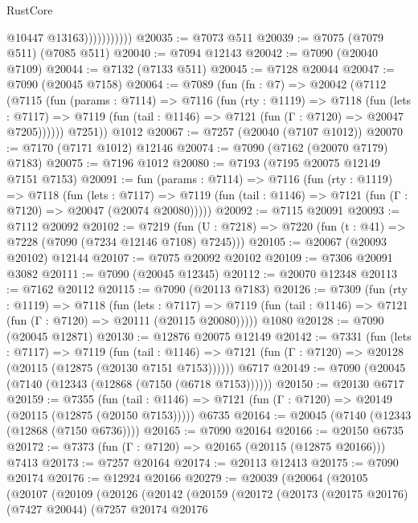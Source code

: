 \begin{lexlean}{RustCore}
\begin{coremodule}
                          @10447
                          @13163)))))))))))
@20035 := @7073 @511
@20039 := @7075 (@7079 @511) (@7085 @511)
@20040 := @7094 @12143
@20042 := @7090 (@20040 @7109)
@20044 := @7132 (@7133 @511)
@20045 := @7128 @20044
@20047 := @7090 (@20045 @7158)
@20064 := @7089
    (fun (fn : @7) =>
    @20042
      (@7112
        (@7115
          (fun (params : @7114) =>
          @7116
            (fun (rty : @1119) =>
            @7118
              (fun (lets : @7117) =>
              @7119 (fun (tail : @1146) => @7121 (fun (Γ : @7120) => @20047 @7205))))))
        @7251))
    @1012
@20067 := @7257 (@20040 (@7107 @1012))
@20070 := @7170 (@7171 @1012) @12146
@20074 := @7090 (@7162 (@20070 @7179) @7183)
@20075 := @7196 @1012
@20080 := @7193 (@7195 @20075 @12149 @7151 @7153)
@20091 := fun (params : @7114) =>
  @7116
    (fun (rty : @1119) =>
    @7118
      (fun (lets : @7117) =>
      @7119 (fun (tail : @1146) => @7121 (fun (Γ : @7120) => @20047 (@20074 @20080)))))
@20092 := @7115 @20091
@20093 := @7112 @20092
@20102 := @7219
    (fun (U : @7218) => @7220 (fun (t : @41) => @7228 (@7090 (@7234 @12146 @7108) @7245)))
@20105 := @20067 (@20093 @20102) @12144
@20107 := @7075 @20092 @20102
@20109 := @7306 @20091 @3082
@20111 := @7090 (@20045 @12345)
@20112 := @20070 @12348
@20113 := @7162 @20112
@20115 := @7090 (@20113 @7183)
@20126 := @7309
    (fun (rty : @1119) =>
    @7118
      (fun (lets : @7117) =>
      @7119 (fun (tail : @1146) => @7121 (fun (Γ : @7120) => @20111 (@20115 @20080)))))
    @1080
@20128 := @7090 (@20045 @12871)
@20130 := @12876 @20075 @12149
@20142 := @7331
    (fun (lets : @7117) =>
    @7119
      (fun (tail : @1146) =>
      @7121 (fun (Γ : @7120) => @20128 (@20115 (@12875 (@20130 @7151 @7153))))))
    @6717
@20149 := @7090 (@20045 (@7140 (@12343 (@12868 (@7150 (@6718 @7153))))))
@20150 := @20130 @6717
@20159 := @7355
    (fun (tail : @1146) => @7121 (fun (Γ : @7120) => @20149 (@20115 (@12875 (@20150 @7153)))))
    @6735
@20164 := @20045 (@7140 (@12343 (@12868 (@7150 @6736))))
@20165 := @7090 @20164
@20166 := @20150 @6735
@20172 := @7373 (fun (Γ : @7120) => @20165 (@20115 (@12875 @20166))) @7413
@20173 := @7257 @20164
@20174 := @20113 @12413
@20175 := @7090 @20174
@20176 := @12924 @20166
@20279 := @20039
    (@20064
      (@20105
        (@20107
          (@20109
            (@20126
              (@20142
                (@20159
                  (@20172
                    (@20173
                      (@20175 @20176)
                      (@7427 @20044)
                      (@7257
                        @20174
                        @20176

\end{coremodule}
\end{lexlean}
